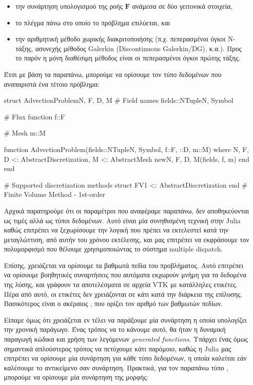 \begin{itemize}
    \item την συνάρτηση υπολογισμού της ροής $\mathbf{F}$ ανάμεσα σε δύο γειτονικά στοιχεία,
    \item το πλέγμα πάνω στο οποίο το πρόβλημα επιλύεται, και
    \item την αριθμητική μέθοδο χωρικής διακριτοποιήσης (π.χ. πεπερασμένοι όγκοι N-τάξης, ασυνεχής μέθοδος Galerkin (Discontinuous Galerkin/DG), κ.α.). Προς το παρόν η μόνη διαθέσιμη μέθοδος είναι οι πεπερασμένοι όγκοι πρώτης τάξης.
\end{itemize}

Έτσι με βάση τα παραπάνω, μπορούμε να ορίσουμε τον τύπο δεδομένων που αναπαριστά ένα τέτοιο πρόβλημα:

{\large
\begin{jllisting}[language=julia,style=jlcodestyle]
struct AdvectionProblem{N, F, D, M}
    # Field names
    fields::NTuple{N, Symbol}

    # Flux function
    f::F

    # Mesh
    m::M

    function AdvectionProblem(fields::NTuple{N, Symbol}, f::F, ::D, m::M) where
            {N, F, D <: AbstractDiscretization, M <: AbstractMesh}
        new{N, F, D, M}(fields, f, m)
    end
end

# Supported discretization methods
struct FV1 <: AbstractDiscretization end # Finite Volume Method - 1st-order
\end{jllisting}
}

Αρχικά παρατηρούμε ότι οι παραμέτροι που αναφέραμε παραπάνω, δεν αποθηκεύονται ως τιμές αλλά ως τύποι δεδομένων.
Αυτό είναι μία συνηθισμένη τεχνική στην Julia καθώς επιτρέπει να ξεχωρίσουμε την λογική που πρέπει να εκτελεστεί κατά την μεταγλώττιση, από αυτήν του χρόνου εκτέλεσης, και μας επιτρέπει να εκφράσουμε τον πολυμορφισμό που θέλουμε χρησιμοποιώντας το σύστημα multiple dispatch.

Επίσης, χρειάζεται να ορίσουμε τα βαθμωτά πεδία του προβλήματος.
Αυτό επιτρέπει να ορίσουμε βοηθητικές συναρτήσεις που αυτόματα εκχωρούν μνήμη για τα δεδομένα της λύσης, και γράφουν τα αποτελέσματα σε αρχεία VTK με κατάλληλες ετικέτες.
Πέρα από αυτό, οι ετικέτες δεν χρειάζονται σε κάτι κατά την διάρκεια της επίλυσης.
Βασικότερος είναι ο ακέραιος , που ορίζει τον αριθμό των βαθμωτών πεδίων.

Είπαμε όμως ότι χρειάζεται εν τέλει να παράξουμε μία συνάρτηση η οποία υπολογίζει την χρονική παράγωγο.
Ένας τρόπος να το κάνουμε αυτό, θα ήταν η δυναμική παραγωγή κώδικα και χρήση των λεγόμενων \emph{generated functions}.
Υπάρχει ένας όμως σημαντικά απλούστερος τρόπος να πετύχουμε κάτι παρόμοιο, καθώς η Julia μας επιτρέπει να ορίσουμε μία συνάρτηση για κάθε τύπο δεδομένων, η οποία καλείται εάν καλέσουμε το αντικείμενο σαν συνάρτηση.
Πρακτικά, για τον παραπάνω τύπο , μπορούμε να ορίσουμε μία συνάρτηση της μορφής:

